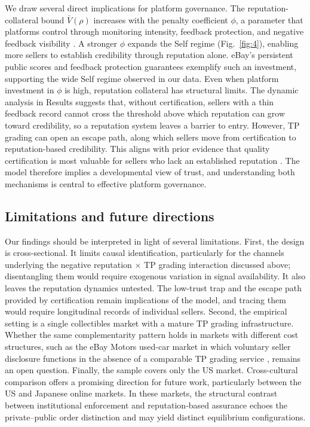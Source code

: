 \documentclass[11pt,letterpaper]{article}
\theoremstyle{definition}
\begin{document}
We draw several direct implications for platform governance. The reputation-collateral bound $\bar{V}(\rho)$ increases with the penalty coefficient $\phi$, a parameter that platforms control through monitoring intensity, feedback protection, and negative feedback visibility \citep{Tadelis2016, BoltonGreinerOckenfels2013}. A stronger $\phi$ expands the Self regime (Fig.~\ref{fig:4}), enabling more sellers to establish credibility through reputation alone. eBay's persistent public scores and feedback protection guarantees exemplify such an investment, supporting the wide Self regime observed in our data. Even when platform investment in $\phi$ is high, reputation collateral has structural limits. The dynamic analysis in Results suggests that, without certification, sellers with a thin feedback record cannot cross the threshold above which reputation can grow toward credibility, so a reputation system leaves a barrier to entry. However, TP grading can open an escape path, along which sellers move from certification to reputation-based credibility. This aligns with prior evidence that quality certification is most valuable for sellers who lack an established reputation \citep{ElfenbeinFismanMcManus2015, DewallyEderington2006}. The model therefore implies a developmental view of trust, and understanding both mechanisms is central to effective platform governance.

\subsection*{Limitations and future directions}

Our findings should be interpreted in light of several limitations. First, the design is cross-sectional. It limits causal identification, particularly for the channels underlying the negative reputation $\times$ TP grading interaction discussed above; disentangling them would require exogenous variation in signal availability. It also leaves the reputation dynamics untested. The low-trust trap and the escape path provided by certification remain implications of the model, and tracing them would require longitudinal records of individual sellers. Second, the empirical setting is a single collectibles market with a mature TP grading infrastructure. Whether the same complementarity pattern holds in markets with different cost structures, such as the eBay Motors used-car market in which voluntary seller disclosure functions in the absence of a comparable TP grading service \citep{Lewis2011}, remains an open question. Finally, the sample covers only the US market. Cross-cultural comparison offers a promising direction for future work, particularly between the US and Japanese online markets. In these markets, the structural contrast between institutional enforcement and reputation-based assurance \citep{Yamagishi2011} echoes the private--public order distinction \citep{Greif1993, Greif1994, GreifTabellini2017, GreifMokyrTabellini2025} and may yield distinct equilibrium configurations.
\end{document}
